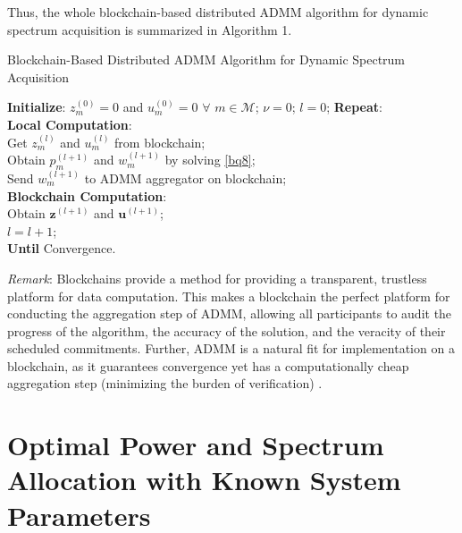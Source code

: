 \documentclass[journal]{IEEEtran}
\begin{document}
Thus, the whole blockchain-based distributed ADMM algorithm for dynamic spectrum acquisition is summarized in Algorithm 1.

\begin{algorithm}[h]
\caption{Blockchain-Based Distributed ADMM Algorithm for Dynamic Spectrum Acquisition}
\begin{algorithmic}[1]
\STATE \textbf{Initialize}: $z_m^{(0)}=0$ and $u_m^{(0)}=0$ $\forall$ $m\in\mathcal{M}$; $\nu=0$; $l=0$;
\STATE \textbf{Repeat}: \\
\hspace{0.5cm} \textbf{Local Computation}:\\
\hspace{1.0cm} Get $z_m^{(l)}$ and $u_m^{(l)}$ from blockchain;\\
\hspace{1.0cm} Obtain $p_m^{(l+1)}$ and $w_m^{(l+1)}$ by solving \eqref{bq8}; \\
\hspace{1.0cm} Send $w_m^{(l+1)}$ to ADMM aggregator on blockchain;\\
\hspace{0.5cm} \textbf{Blockchain Computation}:\\
\hspace{1.0cm} Obtain $\mathbf{z}^{(l+1)}$ and $\mathbf{u}^{(l+1)}$; \\
\hspace{0.5cm} $l=l+1$;\\
\textbf{Until} Convergence.\\
\end{algorithmic}
\end{algorithm}

\emph{Remark}: Blockchains provide a method for providing a transparent, trustless platform for data computation. This makes a blockchain the perfect platform for conducting the aggregation step of ADMM, allowing all participants to audit the progress of the algorithm, the accuracy of the solution, and the veracity of their scheduled commitments. Further, ADMM is a natural fit for implementation on a blockchain, as it guarantees
convergence yet has a computationally cheap aggregation step (minimizing the burden of verification) \cite{Munsing}.

\section{Optimal Power and Spectrum Allocation with Known System Parameters}
\end{document}
